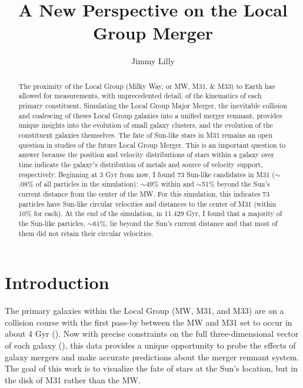 \documentclass{aastex63}
\begin{document}
\title{A New Perspective on the Local Group Merger}

\author{Jimmy Lilly}

\begin{abstract}
The proximity of the Local Group (Milky Way, or MW, M31, \& M33) to Earth has allowed for measurements, with unprecedented detail, of the kinematics of each primary constituent. Simulating the Local Group Major Merger, the inevitable collision and coalescing of theses Local Group galaxies into a unified merger remnant, provides unique insights into the evolution of small galaxy clusters, and the evolution of the constituent galaxies themselves. The fate of Sun-like stars in M31 remains an open question in studies of the future Local Group Merger. This is an important question to answer because the position and velocity distributions of stars within a galaxy over time indicate the galaxy's distribution of metals and source of velocity support, respectively. Beginning at 3 Gyr from now, I found 73 Sun-like candidates in M31 ($\sim$.08\% of all particles in the simulation): $\sim$49\% within and $\sim$51\% beyond the Sun's current distance from the center of the MW. For this simulation, this indicates 73 particles have Sun-like circular velocities and distances to the center of M31 (within 10\% for each). At the end of the simulation, in 11.429 Gyr, I found that a majority of the Sun-like particles, $\sim$61\%, lie beyond the Sun's current distance and that most of them did not retain their circular velocities.
\end{abstract}

\section{Introduction} \label{sec:intro}
The primary galaxies within the Local Group (MW, M31, and M33) are on a collision course with the first pass-by between the MW and M31 set to occur in about 4 Gyr (\cite{2012ApJ...753....9V}). Now with precise constraints on the full three-dimensional vector of each galaxy (\cite{2012ApJ...753....8V}), this data provides a unique opportunity to probe the effects of galaxy mergers and make accurate predictions about the merger remnant system. The goal of this work is to visualize the fate of stars at the Sun's location, but in the disk of M31 rather than the MW.
\end{document}
